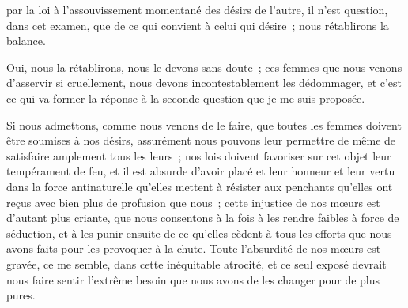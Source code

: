 \documentclass[french,twoside]{book} %
\begin{document}
par la loi à l’assouvissement momentané des désirs de l’autre, il n’est question, dans cet examen, que de ce qui convient à celui qui désire ; nous rétablirons la balance.\par
Oui, nous la rétablirons, nous le devons sans doute ; ces femmes que nous venons d’asservir si cruellement, nous devons incontestablement les dédommager, et c’est ce qui va former la réponse à la seconde question que je me suis proposée.\par
Si nous admettons, comme nous venons de le faire, que toutes les femmes doivent être soumises à nos désirs, assurément nous pouvons leur permettre de même de satisfaire amplement tous les leurs ; nos lois doivent favoriser sur cet objet leur tempérament de feu, et il est absurde d’avoir placé et leur honneur et leur vertu dans la force antinaturelle qu’elles mettent à résister aux penchants qu’elles ont reçus avec bien plus de profusion que nous ; cette injustice de nos mœurs est d’autant plus criante, que nous consentons à la fois à les rendre faibles à force de séduction, et à les punir ensuite de ce qu’elles cèdent à tous les efforts que nous avons faits pour les provoquer à la chute. Toute l’absurdité de nos mœurs est gravée, ce me semble, dans cette inéquitable atrocité, et ce seul exposé devrait nous faire sentir l’extrême besoin que nous avons de les changer pour de plus pures.\par
\end{document}

